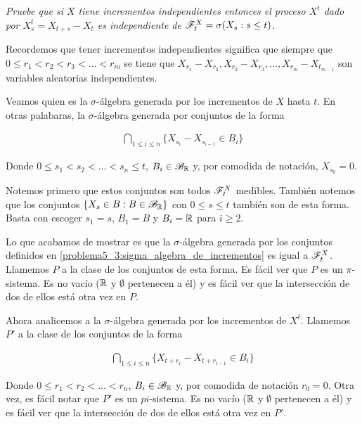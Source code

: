 \emph{
	Pruebe que si $X$ tiene incrementos independientes entonces el proceso $X^t$ dado por $X^t_s=X_{t+s}-X_t$ 
	es independiente de $\mathscr{F}^X_t=\sigma\!\left( X_s : s \leq t\right) $.
}

\afterstatement\pn

Recordemos que tener incrementos independientes significa que siempre que $0 \leq r_1 < r_2 < r_3 < \dots < r_m$ 
se tiene que $X_{r_1} - X_{r_2}, X_{r_2} - X_{r_3}, \dots, X_{r_m} - X_{t_{m-1}}$ son variables aleatorias 
independientes.\pn

Veamos quien es la $\sigma$-álgebra generada por los incrementos de $X$ hasta $t$. En otras palabaras, 
la $\sigma$-álgebra generada por conjuntos de la forma

\begin{align}
    \bigcap_{1 \leq i \leq n} \{ X_{s_i} - X_{s_{i-1}} \in B_i \} \label{problema5_3:sigma_algebra_de_incrementos}
\end{align}\pn

Donde $0 \leq s_1 < s_2 < \dots < s_n \leq t$, $B_i \in \mathscr{B}_{\mathbb{R}}$ y, por comodida de notación, $X_{s_{0}} = 0$.\pn 

Notemos primero que estos conjuntos son todos $\mathscr{F}_t^X$ medibles. También notemos que los conjuntos 
$\{ X_s \in B : B \in \mathscr{B}_{\mathbb{R}} \}$ con $0 \leq s \leq t$ también son de esta forma. Basta con escoger 
$s_1 = s$, $B_1 = B$ y $B_i = \mathbb{R}$ para $i \geq 2$.\pn

Lo que acabamos de mostrar es que la $\sigma$-álgebra generada por los conjuntos definidos en 
\eqref{problema5_3:sigma_algebra_de_incrementos} es igual a $\mathscr{F}_t^X$. Llamemos $P$ a la clase 
de los conjuntos de esta forma. Es fácil ver que $P$ es un $\pi$-sistema. Es no vacío ($\mathbb{R}$ y $\emptyset$ 
pertenecen a él) y es fácil ver que la intersección de dos de ellos está otra vez en $P$.\pn

Ahora analicemos a la $\sigma$-álgebra generada por los incrementos de $X^t$. Llamemos $P'$ a
la clase de los conjuntos de la forma

\begin{align}
    \bigcap_{1 \leq i \leq n} \{  X_{t + r_i} - X_{t + r_{i - 1}} \in B_i \}
\end{align}

Donde $0 \leq r_1 < r_2 < \dots < r_n$,  $B_i \in \mathscr{B}_{\mathbb{R}}$ y, por comodida de notación 
$r_0 = 0$. Otra vez, es fácil notar que $P'$ es un $pi$-sistema. Es no vacío ($\mathbb{R}$ y $\emptyset$ 
pertenecen a él) y es fácil ver que la intersección de dos de ellos está otra vez en $P'$.\pn

